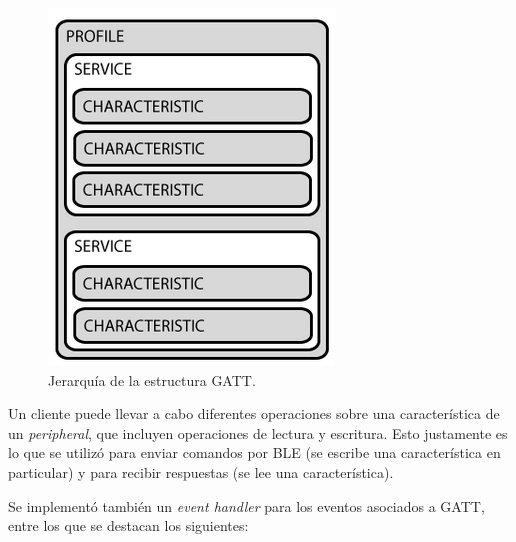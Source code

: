 \begin{figure}[h]
\centering
\includegraphics[scale=0.5]{./Figures/gatt.png}
\caption[Jerarquía de la estructura GATT.]{Jerarquía de la estructura GATT.\footnotemark}
\label{fig:gatt}
\end{figure}


Un cliente puede llevar a cabo diferentes operaciones sobre una característica de un \emph{peripheral}, que incluyen operaciones de lectura y escritura. Esto justamente es lo que se utilizó para enviar comandos por BLE (se escribe una característica en particular) y para recibir respuestas (se lee una característica).

Se implementó también un \emph{event handler} para los eventos asociados a GATT, entre los que se destacan los siguientes:


